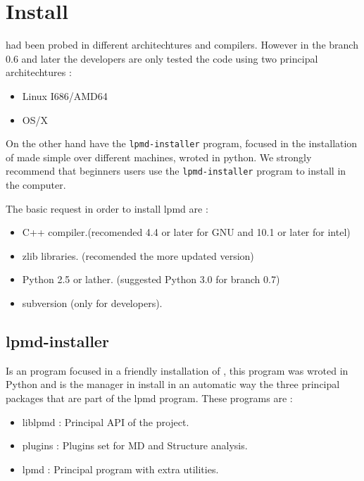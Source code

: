 \chapter{Install}
\label{chap:inst}

{\lpmd} had been probed in different architechtures and compilers. However in
the branch 0.6 and later the developers are only tested the code using two
principal architechtures :

\begin{itemize}
 \item Linux I686/AMD64
 \item OS/X
\end{itemize}

On the other hand {\lpmd} have the \verb|lpmd-installer| program, focused in
the installation of {\lpmd} made simple over different machines, wroted in
python. We strongly recommend that beginners users use the
\verb|lpmd-installer| program to install {\lpmd} in the computer.

The basic request in order to install lpmd are :

\begin{itemize}
 \item C++ compiler.(recomended 4.4 or later for GNU and 10.1 or later for
intel)
 \item zlib libraries. (recomended the more updated version)
 \item Python 2.5 or lather. (suggested Python 3.0 for branch 0.7)
 \item subversion (only for developers).
\end{itemize} 

\section{lpmd-installer}

Is an program focused in a friendly installation of {\lpmd}, this program was
wroted in Python and is the manager in install in an automatic way the three
principal packages that are part of the lpmd program. These programs are :

\begin{itemize}
 \item liblpmd : Principal API of the project.
 \item plugins : Plugins set for MD and Structure analysis.
 \item lpmd : Principal program with extra utilities.
\end{itemize}

